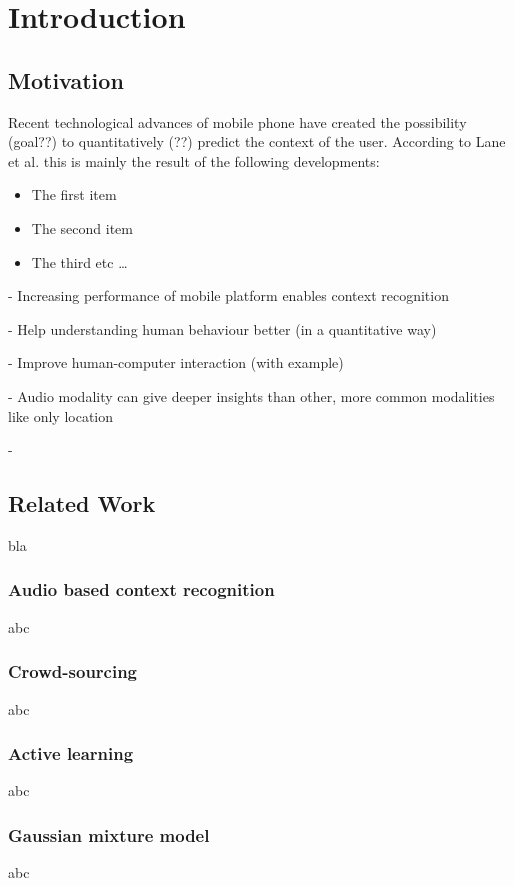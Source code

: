 \chapter{Introduction}\label{cha1}
\section{Motivation}
Recent technological advances of mobile phone have created the possibility (goal??) to quantitatively (??) predict the context of the user. According to Lane et al. this is mainly the result of the following developments:
\begin{itemize}
  \item The first item
  \item The second item
  \item The third etc \ldots
\end{itemize}


- Increasing performance of mobile platform enables context recognition

- Help understanding human behaviour better (in a quantitative way)

- Improve human-computer interaction (with example)

- Audio modality can give deeper insights than other, more common modalities like only location

-  

\section{Related Work}\label{relatedWork}
bla

\subsection{Audio based context recognition}\label{abc}
abc

\subsection{Crowd-sourcing}
abc

\subsection{Active learning}
abc

\subsection{Gaussian mixture model}
abc








